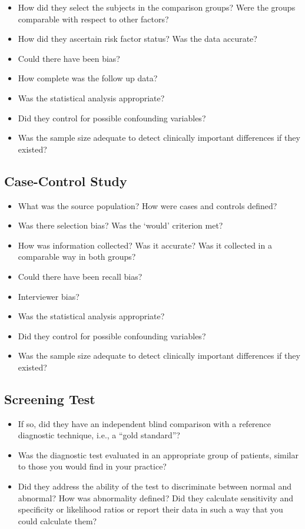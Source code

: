 \documentclass[]{book}
\providecommand{\tightlist}{%
  \setlength{\itemsep}{0pt}\setlength{\parskip}{0pt}}
\begin{document}
\begin{itemize}
\tightlist
\item
  How did they select the subjects in the comparison groups? Were the groups comparable with respect to other factors?
\item
  How did they ascertain risk factor status? Was the data accurate?
\item
  Could there have been bias?
\item
  How complete was the follow up data?
\item
  Was the statistical analysis appropriate?
\item
  Did they control for possible confounding variables?
\item
  Was the sample size adequate to detect clinically important differences if they existed?
\end{itemize}

\hypertarget{case-control-study}{%
\subsection{Case-Control Study}\label{case-control-study}}

\begin{itemize}
\tightlist
\item
  What was the source population? How were cases and controls defined?
\item
  Was there selection bias? Was the `would' criterion met?
\item
  How was information collected? Was it accurate? Was it collected in a comparable way in both groups?
\item
  Could there have been recall bias?
\item
  Interviewer bias?
\item
  Was the statistical analysis appropriate?
\item
  Did they control for possible confounding variables?
\item
  Was the sample size adequate to detect clinically important differences if they existed?
\end{itemize}

\hypertarget{screening-test}{%
\subsection{Screening Test}\label{screening-test}}

\begin{itemize}
\tightlist
\item
  If so, did they have an independent blind comparison with a reference diagnostic technique, i.e., a ``gold standard''?
\item
  Was the diagnostic test evaluated in an appropriate group of patients, similar to those you would find in your practice?
\item
  Did they address the ability of the test to discriminate between normal and abnormal? How was abnormality defined? Did they calculate sensitivity and specificity or likelihood ratios or report their data in such a way that you could calculate them?
\end{itemize}
\end{document}
